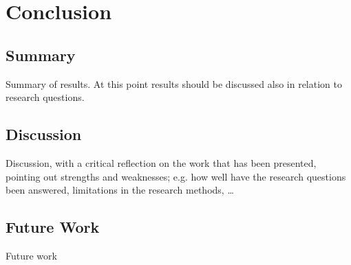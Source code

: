 \chapter{Conclusion}
\section{Summary}
Summary of results. At this point results should be discussed also in
relation to research questions.
\section{Discussion}
Discussion, with a critical reflection on the work that has been presented,
pointing out strengths and weaknesses; e.g. how well have the research questions been answered, limitations in the research methods, …
\section{Future Work}
Future work